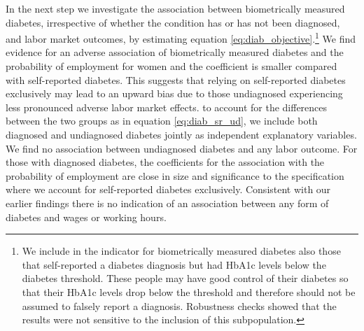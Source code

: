 \documentclass[12pt,english,british]{article}
\begin{document}
In the next step we investigate the association between biometrically measured
diabetes, irrespective of whether
the condition has or has not been diagnosed, and labor market outcomes, by estimating equation \ref{eq:diab_objective}.\footnote{We include in the indicator for biometrically measured diabetes also those that self-reported a diabetes diagnosis
but had \ac{HbA1c} levels below the diabetes threshold. These people may have good control of their diabetes so that their \ac{HbA1c} levels drop below the threshold and therefore should not be assumed to falsely report a diagnosis. Robustness checks showed that the results were not sensitive to the inclusion of this subpopulation.}  We find evidence for an adverse association of biometrically measured diabetes and the probability of employment
for women and the coefficient is smaller compared with self-reported diabetes. This suggests that relying on self-reported
diabetes exclusively may lead to an upward bias due to those undiagnosed experiencing less pronounced adverse labor market effects.
to account for the differences between the two groups as in equation \ref{eq:diab_sr_ud}, we include both diagnosed and undiagnosed diabetes jointly as independent explanatory variables. We find no association between undiagnosed
diabetes and any labor outcome. For those with diagnosed diabetes, the coefficients for the association with the probability of employment
are close in size and significance to the specification where we account for self-reported diabetes exclusively. Consistent with our earlier findings there is no indication of an association between any form of diabetes and wages or working hours. 
 
\end{document}

